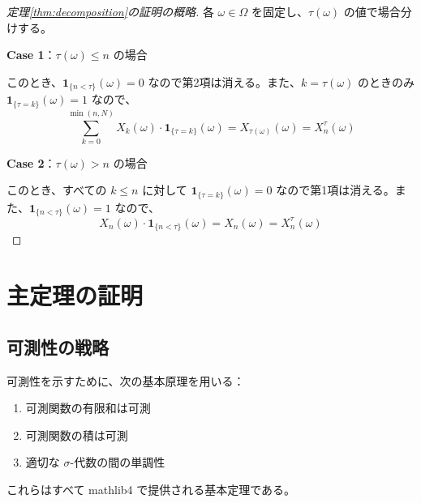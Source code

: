\documentclass[a4paper,12pt]{ltjsarticle}
\theoremstyle{definition}
\newcommand{\one}{\mathbf{1}}
\begin{document}
\begin{center}
\end{center}

\begin{proof}[定理\ref{thm:decomposition}の証明の概略]
各 $\omega \in \Omega$ を固定し、$\tau(\omega)$ の値で場合分けする。

\textbf{Case 1}：$\tau(\omega) \leq n$ の場合

このとき、$\one_{\{n < \tau\}}(\omega) = 0$ なので第2項は消える。また、$k = \tau(\omega)$ のときのみ $\one_{\{\tau = k\}}(\omega) = 1$ なので、
\[
\sum_{k=0}^{\min(n,N)} X_k(\omega) \cdot \one_{\{\tau = k\}}(\omega) = X_{\tau(\omega)}(\omega) = X^\tau_n(\omega)
\]

\textbf{Case 2}：$\tau(\omega) > n$ の場合

このとき、すべての $k \leq n$ に対して $\one_{\{\tau = k\}}(\omega) = 0$ なので第1項は消える。また、$\one_{\{n < \tau\}}(\omega) = 1$ なので、
\[
X_n(\omega) \cdot \one_{\{n < \tau\}}(\omega) = X_n(\omega) = X^\tau_n(\omega)
\]
\end{proof}

\section{主定理の証明}

\subsection{可測性の戦略}

\begin{bourbaki}[ブルバキの構成的アプローチ]
可測性を示すために、次の基本原理を用いる：
\begin{enumerate}
\item 可測関数の有限和は可測
\item 可測関数の積は可測
\item 適切な $\sigma$-代数の間の単調性
\end{enumerate}
これらはすべて mathlib4 で提供される基本定理である。
\end{bourbaki}
\end{document}
